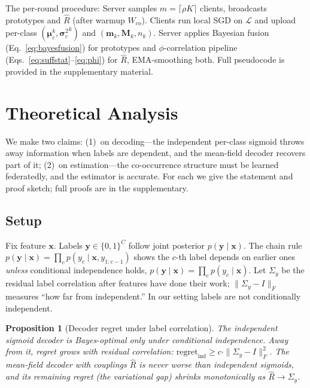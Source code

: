 \documentclass[10pt,twocolumn,letterpaper]{article}
\newtheorem{proposition}{Proposition}
\theoremstyle{definition}
\newcommand{\Rhat}{\widehat{R}}
\newcommand{\Sigmay}{\Sigma_{y}}
\newcommand{\bc}{\boldsymbol{\mu}_c}
\newcommand{\sigc}{\boldsymbol{\sigma}_c^{2}}
\begin{document}
The per-round procedure: Server samples $m{=}\lceil\rho K\rceil$ clients, broadcasts prototypes and $\Rhat$ (after warmup $W_{co}$). Clients run local SGD on $\mathcal{L}$ and upload per-class $(\bc^{k},{\sigc}^{k})$ and $(\mathbf{m}_k,\mathbf{M}_k,n_k)$. Server applies Bayesian fusion (Eq.~\ref{eq:bayesfusion}) for prototypes and $\phi$-correlation pipeline (Eqs.~\ref{eq:suffstat}--\ref{eq:phi}) for $\Rhat$, EMA-smoothing both. Full pseudocode is provided in the supplementary material.

\section{Theoretical Analysis}
\label{sec:theory}

We make two claims: (1)~on decoding---the independent per-class sigmoid throws away information when labels are dependent, and the mean-field decoder recovers part of it; (2)~on estimation---the co-occurrence structure must be learned federatedly, and the estimator is accurate. For each we give the statement and proof sketch; full proofs are in the supplementary.

\subsection{Setup}

Fix feature $\mathbf{x}$. Labels $\mathbf{y}{\in}\{0,1\}^{C}$ follow joint posterior $p(\mathbf{y}{\mid}\mathbf{x})$. The chain rule $p(\mathbf{y}{\mid}\mathbf{x}){=}\prod_c p(y_c{\mid}\mathbf{x},y_{1:c-1})$ shows the $c$-th label depends on earlier ones \emph{unless} conditional independence holds, \ie $p(\mathbf{y}{\mid}\mathbf{x}){=}\prod_c p(y_c{\mid}\mathbf{x})$. Let $\Sigmay$ be the residual label correlation after features have done their work; $\|\Sigmay{-}I\|_F$ measures ``how far from independent.'' In our setting labels are not conditionally independent.

\begin{proposition}[Decoder regret under label correlation]
\label{prop:regret}
The independent sigmoid decoder is Bayes-optimal only under conditional independence. Away from it, regret grows with residual correlation: $\mathrm{regret}_{\mathrm{ind}}\geq c\cdot\|\Sigmay{-}I\|_F^{2}$. The mean-field decoder with couplings $\Rhat$ is never worse than independent sigmoids, and its remaining regret (the variational gap) shrinks monotonically as $\Rhat\to\Sigmay$.
\end{proposition}
\end{document}
